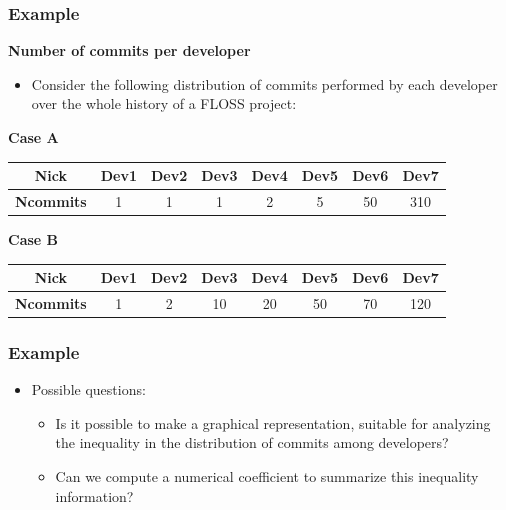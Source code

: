 
\begin{frame}
\frametitle{Example}

\textbf{Number of commits per developer}
\begin{itemize}
\item Consider the following distribution of commits performed by each developer over
the whole history of a FLOSS project:
\end{itemize}

\textbf{Case A}
\begin{tabular}{|c|c|c|c|c|c|c|c|}
\hline
\textbf{Nick} & Dev1 & Dev2 & Dev3 & Dev4 & Dev5 & Dev6 & Dev7 \\
\hline
\textbf{Ncommits} & 1 & 1 & 1& 2 & 5 & 50 & 310 \\
\hline
\end{tabular}

\vspace{1cm}

\textbf{Case B}
\begin{tabular}{|c|c|c|c|c|c|c|c|}
\hline
\textbf{Nick} & Dev1 & Dev2 & Dev3 & Dev4 & Dev5 & Dev6 & Dev7 \\
\hline
\textbf{Ncommits} & 1 & 2 & 10& 20 & 50 & 70 & 120 \\
\hline
\end{tabular}

\end{frame}


\begin{frame}
\frametitle{Example}

\begin{itemize}
  \item Possible questions:
  \begin{itemize}
   \item Is it possible to make a graphical representation, suitable for
analyzing the inequality in the distribution of commits among developers?

   \item Can we compute a numerical coefficient to summarize this inequality
information?
  \end{itemize}

\end{itemize}

\end{frame}

